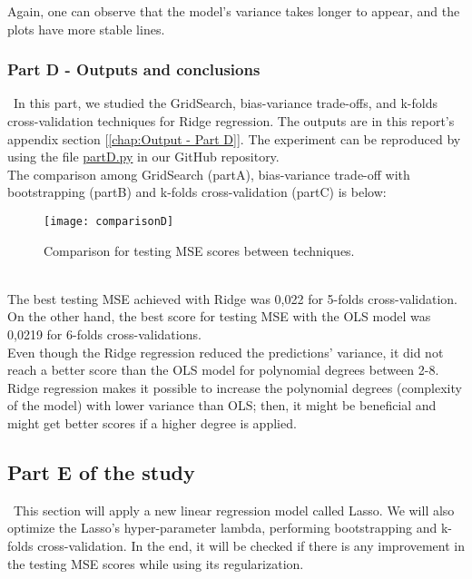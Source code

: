 Again, one can observe that the model's variance takes longer to appear, and the plots have more stable lines. \\

\subsubsection{Part D - Outputs and conclusions}
\label{chap:Part D - Outputs and conclusions}

\quad \, In this part, we studied the GridSearch, bias-variance trade-offs, and k-folds cross-validation techniques for Ridge regression. The outputs are in this report's appendix section [\ref{chap:Output - Part D}]. The experiment can be reproduced by using the file \href{https://github.com/fabiorodp/UiO-FYS-STK4155/blob/master/Project1/partD.py}{partD.py} in our GitHub repository.\\

The comparison among GridSearch (partA), bias-variance trade-off with bootstrapping (partB) and k-folds cross-validation (partC) is below:\\

\begin{figure}[H]
\label{fig:comparisonD}
\centering
\texttt{[image: comparisonD]}
\caption{Comparison for testing MSE scores between techniques.}
\end{figure}\\

The best testing MSE achieved with Ridge was 0,022 for 5-folds cross-validation. On the other hand, the best score for testing MSE with the OLS model was 0,0219 for 6-folds cross-validations.\\

Even though the Ridge regression reduced the predictions' variance, it did not reach a better score than the OLS model for polynomial degrees between 2-8.\\

Ridge regression makes it possible to increase the polynomial degrees (complexity of the model) with lower variance than OLS; then, it might be beneficial and might get better scores if a higher degree is applied.\\

\subsection{Part E of the study}
\label{chap:Part E of the study}

\quad \, This section will apply a new linear regression model called Lasso. We will also optimize the Lasso's hyper-parameter lambda, performing bootstrapping and k-folds cross-validation. In the end, it will be checked if there is any improvement in the testing MSE scores while using its regularization. \\


